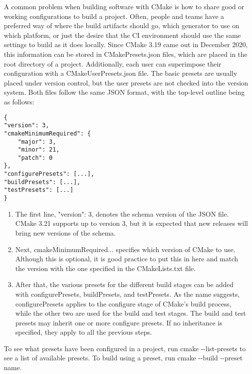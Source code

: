 A common problem when building software with CMake is how to share good or working configurations to build a project. Often, people and teams have a preferred way of where the build artifacts should go, which generator to use on which platform, or just the desire that the CI environment should use the same settings to build as it does locally. Since CMake 3.19 came out in December 2020, this information can be stored in CMakePresets.json files, which are placed in the root directory of a project. Additionally, each user can superimpose their configuration with a CMakeUserPresets.json file. The basic presets are usually placed under version control, but the user presets are not checked into the version system. Both files follow the same JSON format, with the top-level outline being as follows:

\begin{lstlisting}[style=styleCMake]
{
"version": 3,
"cmakeMinimumRequired": {
	"major": 3,
	"minor": 21,
	"patch": 0
},
"configurePresets": [...],
"buildPresets": [...],
"testPresets": [...]
}
\end{lstlisting}

\begin{enumerate}
\item 
The first line, "version": 3, denotes the schema version of the JSON file. CMake 3.21 supports up to version 3, but it is expected that new releases will bring new versions of the schema.

\item 
Next, cmakeMinimumRequired{...} specifies which version of CMake to use. Although this is optional, it is good practice to put this in here and match the version with the one specified in the CMakeLists.txt file.

\item 
After that, the various presets for the different build stages can be added with configurePresets, buildPresets, and testPresets. As the name suggests, configurePresets applies to the configure stage of CMake's build process, while the other two are used for the build and test stages. The build and test presets may inherit one or more configure presets. If no inheritance is specified, they apply to all the previous steps.
\end{enumerate}

To see what presets have been configured in a project, run cmake -{}-list-presets to see a list of available presets. To build using a preset, run cmake -{}-build -{}-preset name.


